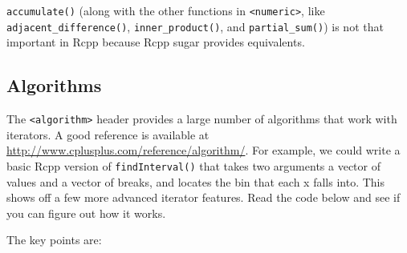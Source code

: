\texttt{accumulate()} (along with the other functions in
\texttt{\textless{}numeric\textgreater{}}, like
\texttt{adjacent\_difference()}, \texttt{inner\_product()}, and
\texttt{partial\_sum()}) is not that important in Rcpp because Rcpp
sugar provides equivalents.

\hypertarget{algorithms}{%
\subsection{Algorithms}\label{algorithms}}

The \texttt{\textless{}algorithm\textgreater{}} header provides a large
number of algorithms that work with iterators. A good reference is
available at \url{http://www.cplusplus.com/reference/algorithm/}. For
example, we could write a basic Rcpp version of \texttt{findInterval()}
that takes two arguments a vector of values and a vector of breaks, and
locates the bin that each x falls into. This shows off a few more
advanced iterator features. Read the code below and see if you can
figure out how it works. 

\begin{Shaded}
\begin{Highlighting}[]
 



\NormalTok{  \}}

\NormalTok{\}}
\end{Highlighting}
\end{Shaded}

The key points are:


